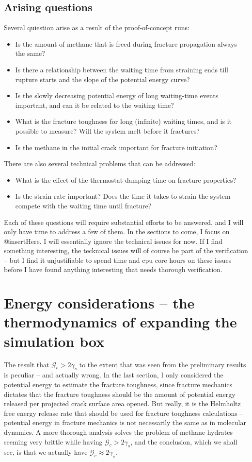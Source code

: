 \subsection{Arising questions}
Several quiestion arise as a result of the proof-of-concept runs:
\begin{itemize}
\item Is the amount of methane that is freed during fracture propagation always the same?
\item Is there a relationship between the waiting time from straining ends till rupture starts and the slope of the potential energy curve?
\item Is the slowly decreasing potential energy of long waiting-time events important, and can it be related to the waiting time?
\item What is the fracture toughness for long (infinite) waiting times, and is it possible to measure? Will the system melt before it fractures?
\item Is the methane in the initial crack important for fracture initiation?
\end{itemize}

There are also several technical problems that can be addressed:
\begin{itemize}
\item What is the effect of the thermostat damping time on fracture properties?
\item Is the strain rate important? Does the time it takes to strain the system compete with the waiting time until fracture?
\end{itemize}

Each of these questions will require substantial efforts to be answered, and I will only have time to address a few of them. In the sections to come, I focus on @insertHere. I will essentially ignore the technical issues for now. If I find something interesting, the tecknical issues will of course be part of the verification -- but I find it unjustifiable to spend time and cpu core hours on these issues before I have found anything interesting that needs thorough verification.

\section{Energy considerations -- the thermodynamics of expanding the simulation box}
The result that $\mathcal{G}_c > 2\gamma_s$ to the extent that was seen from the preliminary results is peculiar -- and actually wrong. In the last section, I only considered the potential energy to estimate the fracture toughness, since fracture mechanics dictates that the fracture toughness should be the amount of potential energy released per projected crack surface area opened. But really, it is the Helmholtz free energy release rate that should be used for fracture toughness calculations -- potential energy in fracture mechanics is not necessarily the same as in molecular dynamics. A more thorough analysis solves the problem of methane hydrates seeming very brittle while having $\mathcal{G}_c > 2\gamma_s$, and the conclusion, which we shall see, is that we actually have $\mathcal{G}_c \approx 2\gamma_s$.

